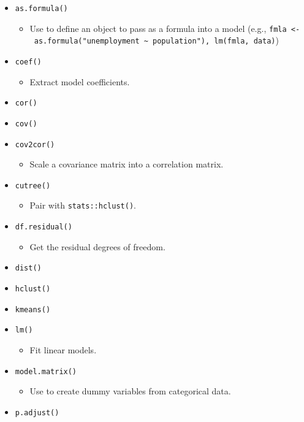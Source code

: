 \documentclass[
]{book}
\providecommand{\tightlist}{%
  \setlength{\itemsep}{0pt}\setlength{\parskip}{0pt}}
\begin{document}
\begin{itemize}
\item
  \texttt{as.formula()}

  \begin{itemize}
  \tightlist
  \item
    Use to define an object to pass as a formula into a model (e.g., \texttt{fmla\ \textless{}-\ as.formula("unemployment\ \textasciitilde{}\ population"),\ lm(fmla,\ data)})
  \end{itemize}
\item
  \texttt{coef()}

  \begin{itemize}
  \tightlist
  \item
    Extract model coefficients.
  \end{itemize}
\item
  \texttt{cor()}
\item
  \texttt{cov()}
\item
  \texttt{cov2cor()}

  \begin{itemize}
  \tightlist
  \item
    Scale a covariance matrix into a correlation matrix.
  \end{itemize}
\item
  \texttt{cutree()}

  \begin{itemize}
  \tightlist
  \item
    Pair with \texttt{stats::hclust()}.
  \end{itemize}
\item
  \texttt{df.residual()}

  \begin{itemize}
  \tightlist
  \item
    Get the residual degrees of freedom.
  \end{itemize}
\item
  \texttt{dist()}
\item
  \texttt{hclust()}
\item
  \texttt{kmeans()}
\item
  \texttt{lm()}

  \begin{itemize}
  \tightlist
  \item
    Fit linear models.
  \end{itemize}
\item
  \texttt{model.matrix()}

  \begin{itemize}
  \tightlist
  \item
    Use to create dummy variables from categorical data.
  \end{itemize}
\item
  \texttt{p.adjust()}


\end{itemize}
\end{document}

